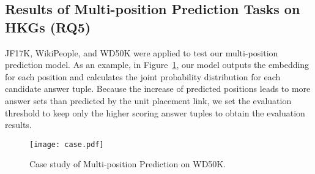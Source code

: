 \documentclass[11pt]{article}
\begin{document}
\subsection{Results of Multi-position Prediction Tasks on HKGs (RQ5)}

JF17K, WikiPeople, and WD50K were applied to test our multi-position prediction model. As an example, in Figure~\ref{case}, our model outputs the embedding for each position and calculates the joint probability distribution for each candidate answer tuple. Because the increase of predicted positions leads to more answer sets than predicted by the unit placement link, we set the evaluation threshold to keep only the higher scoring answer tuples to obtain the evaluation results. 

\begin{figure}[ht]
\centering
\texttt{[image: case.pdf]}
\caption{Case study of Multi-position Prediction on WD50K.}
\label{case}
\end{figure}
\end{document}
